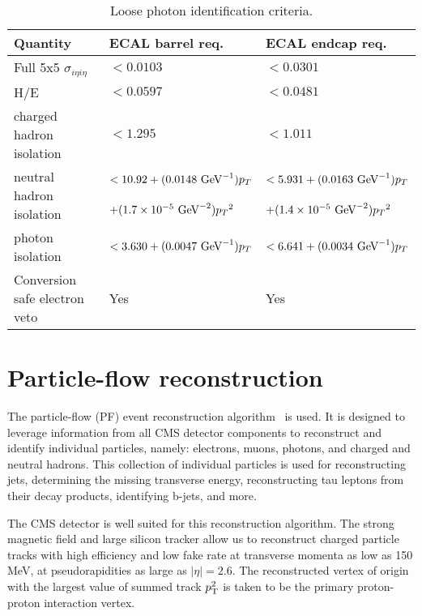 \begin{table}[htbp]
  \begin{center}
 {\footnotesize
  \begin{tabular} {lll}
\hline
Quantity                                   &  ECAL barrel req. & ECAL endcap req.  \\
\hline
Full 5x5 $\sigma_{i\eta i\eta}$            & $< 0.0103$ & $< 0.0301$     \\ \hline 
H/E                                        & $< 0.0597$ & $< 0.0481$     \\ \hline 
charged hadron isolation                   & $< 1.295$  & $< 1.011$      \\ \hline 
\multirow{2}{*}{neutral hadron isolation}  & $< 10.92 + (0.0148\,{\,\text{Ge\hspace{-.08em}V}}^{-1})p_T$          & $< 5.931 + (0.0163\,{\,\text{Ge\hspace{-.08em}V}}^{-1})p_T$        \\  
                                           & $+ (1.7\times 10^{-5}\,{\,\text{Ge\hspace{-.08em}V}}^{-2}){p_T}^2$   & $+(1.4\times 10^{-5}\,{\,\text{Ge\hspace{-.08em}V}}^{-2}){p_T}^2$  \\ \hline
photon isolation                           & $< 3.630 + (0.0047\,{\,\text{Ge\hspace{-.08em}V}}^{-1})p_T$          & $< 6.641 + (0.0034\,{\,\text{Ge\hspace{-.08em}V}}^{-1})p_T$        \\ \hline 
Conversion safe electron veto              & Yes & Yes           \\
\hline
\end{tabular}
}
\caption{Loose photon identification criteria.}
\label{tab:PhotonIDLoose}
  \end{center}
\end{table}


\section{Particle-flow reconstruction}
\label{sec:pf}

The particle-flow (PF) event reconstruction algorithm~\cite{CMS-PRF-14-001} is used.
It is designed to leverage information from all CMS detector components to reconstruct
and identify individual particles, namely: electrons, muons, photons, and charged and neutral hadrons.
This collection of individual particles is used for reconstructing jets,
determining the missing transverse energy, reconstructing tau leptons from their decay products,
identifying b-jets, and more.

The CMS detector is well suited for this reconstruction algorithm. 
The strong magnetic field and large silicon tracker allow us to reconstruct charged particle tracks
with high efficiency and low fake rate at transverse momenta as low as 150 MeV, at pseudorapidities as large as $|\eta|=2.6$.
The reconstructed vertex of origin with the largest value of summed track $p_{\mathrm{T}}^2$ is taken to be the primary proton-proton interaction vertex.

